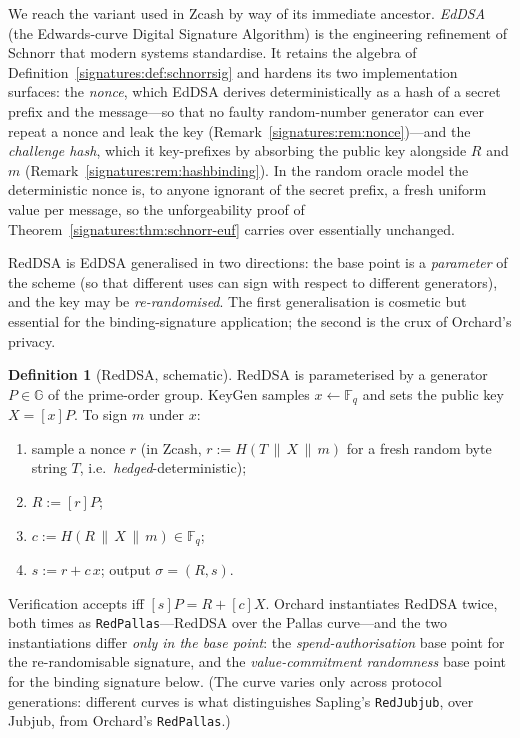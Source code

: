 \documentclass[11pt,a4paper]{article}
\theoremstyle{definition}
\newtheorem{definition}[theorem]{Definition}
\theoremstyle{remark}
\newcommand{\G}{\ensuremath{\mathbb{G}}}
\newcommand{\Fq}{\ensuremath{\mathbb{F}_{q}}}
\begin{document}
We reach the variant used in Zcash by way of its immediate ancestor. \emph{EdDSA} (the Edwards-curve Digital Signature Algorithm) is the engineering refinement of Schnorr that modern systems standardise. It retains the algebra of Definition~\ref{signatures:def:schnorrsig} and hardens its two implementation surfaces: the \emph{nonce}, which EdDSA derives deterministically as a hash of a secret prefix and the message---so that no faulty random-number generator can ever repeat a nonce and leak the key (Remark~\ref{signatures:rem:nonce})---and the \emph{challenge hash}, which it key-prefixes by absorbing the public key alongside \(R\) and \(m\) (Remark~\ref{signatures:rem:hashbinding}). In the random oracle model the deterministic nonce is, to anyone ignorant of the secret prefix, a fresh uniform value per message, so the unforgeability proof of Theorem~\ref{signatures:thm:schnorr-euf} carries over essentially unchanged.

RedDSA is EdDSA generalised in two directions: the base point is a \emph{parameter} of the scheme (so that different uses can sign with respect to different generators), and the key may be \emph{re-randomised}. The first generalisation is cosmetic but essential for the binding-signature application; the second is the crux of Orchard's privacy.

\begin{definition}[RedDSA, schematic]\label{signatures:def:reddsa}
RedDSA is parameterised by a generator \(P \in \G\) of the prime-order group. KeyGen samples \(x \gets \Fq\) and sets the public key \(X = [x]P\). To sign \(m\) under \(x\):
\begin{enumerate}
  \item sample a nonce \(r\) (in Zcash, \(r := H(T \,\|\, X \,\| \,m)\) for a fresh random byte string \(T\), i.e.\ \emph{hedged}-deterministic);
  \item \(R := [r]P\);
  \item \(c := H(R \,\|\, X \,\|\, m) \in \Fq\);
  \item \(s := r + c\,x\); output \(\sigma = (R, s)\).
\end{enumerate}
Verification accepts iff \([s]P = R + [c]X\). Orchard instantiates RedDSA twice, both times as \texttt{RedPallas}---RedDSA over the Pallas curve---and the two instantiations differ \emph{only in the base point}: the \emph{spend-authorisation} base point for the re-randomisable signature, and the \emph{value-commitment randomness} base point for the binding signature below. (The curve varies only across protocol generations: different curves is what distinguishes Sapling's \texttt{RedJubjub}, over Jubjub, from Orchard's \texttt{RedPallas}.)
\end{definition}
\end{document}
